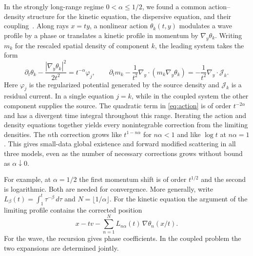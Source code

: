 \documentclass[reqno,10pt,letterpaper]{amsart}
\numberwithin{equation}{section}
\begin{document}
In the strongly long-range regime $0<\alpha\leq 1/2$, we found a common action--density structure for the kinetic equation, the dispersive equation, and their coupling~\cite{HX26b}. Along rays $x=ty$, a nonlinear action $\theta_k(t,y)$ modulates a wave profile by a phase or translates a kinetic profile in momentum by $\nabla_y\theta_k$. Writing $m_k$ for the rescaled spatial density of component $k$, the leading system takes the form
\begin{equation}\label{eq:action}
 \partial_t\theta_k-\frac{|\nabla_y\theta_k|^2}{2t^2}=t^{-\alpha}\varphi_j,\qquad
 \partial_t m_k-\frac{1}{t^2}\nabla_y\!\cdot(m_k\nabla_y\theta_k)
 =-\frac{1}{t^2}\nabla_y\!\cdot\mathcal J_k .
\end{equation}
Here $\varphi_j$ is the regularized potential generated by the source density and $\mathcal J_k$ is a residual current. In a single equation $j=k$, while in the coupled system the other component supplies the source. The quadratic term in \eqref{eq:action} is of order $t^{-2\alpha}$ and has a divergent time integral throughout this range. Iterating the action and density equations together yields every nonintegrable correction from the limiting densities. The $n$th correction grows like $t^{1-n\alpha}$ for $n\alpha<1$ and like $\log t$ at $n\alpha=1$. This gives small-data global existence and forward modified scattering in all three models, even as the number of necessary corrections grows without bound as $\alpha\downarrow0$.

For example, at $\alpha=1/2$ the first momentum shift is of order $t^{1/2}$ and the second is logarithmic. Both are needed for convergence. More generally, write $L_\beta(t)=\int_1^t \tau^{-\beta}\,d\tau$ and $N=\lfloor1/\alpha\rfloor$. For the kinetic equation the argument of the limiting profile contains the corrected position
\[
 x-tv-\sum_{n=1}^{N} L_{n\alpha}(t)\,\nabla\theta_n(x/t).
\]
For the wave, the recursion gives phase coefficients. In the coupled problem the two expansions are determined jointly.
\end{document}
